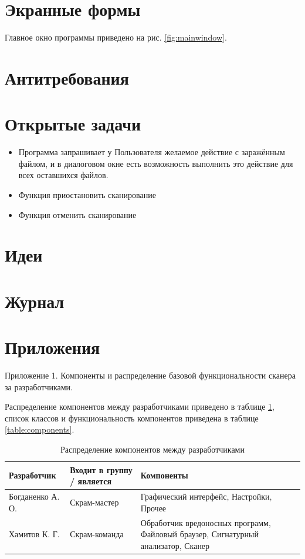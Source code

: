 \section{Экранные формы}
Главное окно программы приведено на рис. \ref{fig:mainwindow}.
\section{Антитребования}
\section{Открытые задачи}
\begin{itemize}
\item Программа запрашивает у Пользователя желаемое действие с заражённым
файлом, и в диалоговом окне есть возможность выполнить это действие для всех
оставшихся файлов.
\item Функция приостановить сканирование
\item Функция отменить сканирование
\end{itemize}
\section{Идеи}
\section{Журнал}
\section{Приложения}
Приложение 1. Компоненты и распределение базовой функциональности сканера за
разработчиками.

Распределение компонентов между разработчиками приведено в таблице
\ref{table:responsibilities}, список классов и функциональность компонентов
приведена в таблице \ref{table:components}.
\begin{table}[h]
\centering
\begin{tabular}{|l|p{3cm}|p{3cm}|}
\hline
Разработчик & Входит в группу / является & Компоненты \\
\hline
Богданенко А. О. & Скрам-мастер & Графический интерфейс, Настройки, Прочее \\
\hline
Хамитов К. Г. & Скрам-команда & Обработчик вредоносных программ, Файловый
браузер, Сигнатурный анализатор, Сканер \\
\hline
\end{tabular}
\caption{Распределение компонентов между разработчиками}
\label{table:responsibilities}
\end{table}

